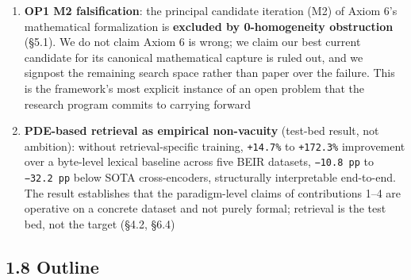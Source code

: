 \documentclass[
]{article}
\begin{document}
\begin{enumerate}
  Langevin succeeds on the inner barrier (\texttt{ΔV/T\ =\ 16}, observed
  85\% crossing at \texttt{t\_sim\ =\ 250}) but fails on the outer
  barrier (\texttt{ΔV/T\ =\ 105.5}, Kramers escape time exceeds horizon
  by \textbf{\textasciitilde43 orders of magnitude} log-gap),
  establishing that the \texttt{u\ =\ 4} 0\% occupancy is a
  \textbf{timescale--horizon mismatch} rather than a paradigm
  limitation; \textbf{(ii) A1 inner-barrier anomaly} --- the same inner
  crossing exceeds the 1D Kramers prefactor prediction by \textbf{factor
  \textasciitilde10⁴ (\textasciitilde4 orders)}, flagged as an open
  methodological question concerning field-theoretic rate theory (§4.8,
  §4.9, §4.10, §4.11, §5.2)
\item
  \textbf{OP1 M2 falsification}: the principal candidate iteration (M2)
  of Axiom 6's mathematical formalization is \textbf{excluded by
  0-homogeneity obstruction} (§5.1). We do not claim Axiom 6 is wrong;
  we claim our best current candidate for its canonical mathematical
  capture is ruled out, and we signpost the remaining search space
  rather than paper over the failure. This is the framework's most
  explicit instance of an open problem that the research program commits
  to carrying forward
\item
  \textbf{PDE-based retrieval as empirical non-vacuity} (test-bed
  result, not ambition): without retrieval-specific training,
  \texttt{+14.7\%} to \texttt{+172.3\%} improvement over a byte-level
  lexical baseline across five BEIR datasets, \texttt{−10.8\ pp} to
  \texttt{−32.2\ pp} below SOTA cross-encoders, structurally
  interpretable end-to-end. The result establishes that the
  paradigm-level claims of contributions 1--4 are operative on a
  concrete dataset and not purely formal; retrieval is the test bed, not
  the target (§4.2, §6.4)
\end{enumerate}

\hypertarget{outline}{%
\subsection{1.8 Outline}\label{outline}}
\end{document}

